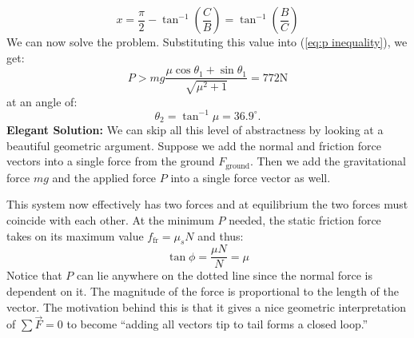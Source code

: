 \documentclass{article}
\begin{document}
\begin{equation}
    x = \frac{\pi}{2}-\tan^{-1}\left(\frac{C}{B}\right)=\tan^{-1}\left(\frac{B}{C}\right)
    \label{eq:}
\end{equation}
We can now solve the problem. Substituting this value into (\ref{eq:p inequality}), we get:
\begin{equation}
    P > mg\frac{\mu\cos\theta_1+\sin\theta_1}{\sqrt{\mu^2+1}} = 772\si{\newton}
    \label{eq:}
\end{equation}
at an angle of:
\begin{equation}
    \theta_2=\tan^{-1}\mu =36.9^\circ.
    \label{eq:}
\end{equation}
\textbf{Elegant Solution:} We can skip all this level of abstractness by looking at a beautiful geometric argument. Suppose we add the normal and friction force vectors into a single force from the ground $F_\text{ground}$. Then we add the gravitational force $mg$ and the applied force $P$ into a single force vector as well.
\begin{center}
\end{center}
This system now effectively has two forces and at equilibrium the two forces must coincide with each other. At the minimum $P$ needed, the static friction force takes on its maximum value $f_\text{fr}=\mu_sN$ and thus:
\begin{equation}
    \tan\phi=\frac{\mu N}{N}=\mu
    \label{eq:phi in terms of mu}
\end{equation}
Notice that $P$ can lie anywhere on the dotted line since the normal force is dependent on it. The magnitude of the force is proportional to the length of the vector. The motivation behind this is that it gives a nice geometric interpretation of $\sum \vec{F}=0$ to become ``adding all vectors tip to tail forms a closed loop.''
\end{document}

